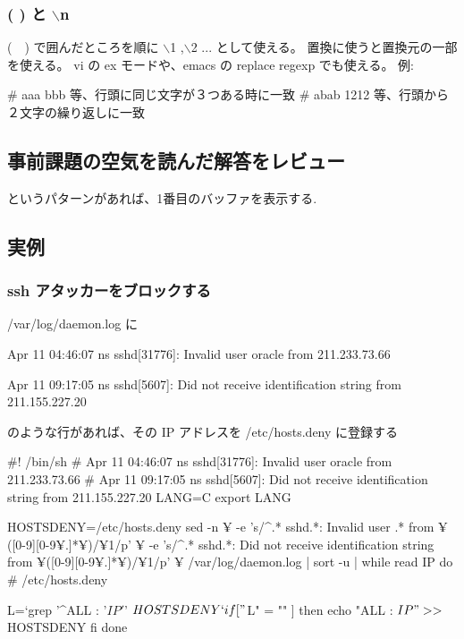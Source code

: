 \documentclass[mingoth,a4paper]{jsarticle}
\begin{document}
\subsubsection{( ) と $\backslash$n}

(　) で囲んだところを順に $\backslash$1 ,$\backslash$2 ... として使える。
置換に使うと置換元の一部を使える。
vi の ex モードや、emacs の replace regexp でも使える。 
例:
\begin{commandline}
      # aaa bbb 等、行頭に同じ文字が３つある時に一致 
      # abab 1212 等、行頭から２文字の繰り返しに一致 
\end{commandline}

\subsection{事前課題の空気を読んだ解答をレビュー}
というパターンがあれば、1番目のバッファを表示する.

\subsection{実例}
\subsubsection{ssh アタッカーをブロックする}
/var/log/daemon.log に
\begin{commandline}
      Apr 11 04:46:07 ns sshd[31776]: Invalid user oracle from 211.233.73.66

      Apr 11 09:17:05 ns sshd[5607]: Did not receive identification string from 211.155.227.20
\end{commandline}
      のような行があれば、その IP アドレスを /etc/hosts.deny に登録する
      \begin{commandline}          
      #! /bin/sh
      # Apr 11 04:46:07 ns sshd[31776]: Invalid user oracle from 211.233.73.66
      # Apr 11 09:17:05 ns sshd[5607]: Did not receive identification string from 211.155.227.20 
      LANG=C
      export LANG

      HOSTSDENY=/etc/hosts.deny 
      sed -n ¥
      -e 's/^.* sshd.*: Invalid user .* from ¥([0-9][0-9¥.]*¥)/¥1/p' ¥
      -e 's/^.* sshd.*: Did not receive identification string from ¥([0-9][0-9¥.]*¥)/¥1/p' ¥
      /var/log/daemon.log | sort -u |
      while read IP
      do
      # /etc/hosts.deny
              
      L=`grep '^ALL : '$IP'$' $HOSTSDENY`
      
      if [ "$L" = "" ]
      then
      echo "ALL : $IP" >> $HOSTSDENY
      fi
      done
  \end{commandline}
\end{document}

